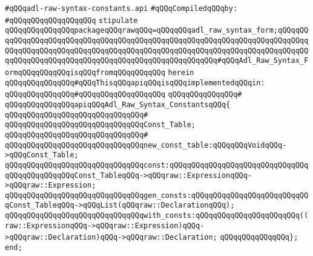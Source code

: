 \label{src/lib/compiler/back/low/tools/adl-syntax/adl-raw-syntax-constants.api}
\verb|#qQQqadl-raw-syntax-constants.api|\newline
\newline
\verb|#qQQqCompiledqQQqby:|\newline
\verb|#qQQqqQQqqQQqqQQqqQQq|\newline
\newline
\verb|stipulate|\newline
\verb|qQQqqQQqqQQqqQQqpackageqQQqrawqQQq=qQQqqQQqadl_raw_syntax_form;qQQqqQQqqQQqqQQqqQQqqQQqqQQqqQQqqQQqqQQqqQQqqQQqqQQqqQQqqQQqqQQqqQQqqQQqqQQqqQQqqQQqqQQqqQQqqQQqqQQqqQQqqQQqqQQqqQQqqQQqqQQqqQQqqQQqqQQqqQQqqQQqqQQqqQQqqQQqqQQqqQQqqQQqqQQqqQQqqQQqqQQqqQQqqQQqqQQq#qQQqAdl_Raw_Syntax_FormqQQqqQQqqQQqisqQQqfromqQQqqQQqqQQq|\newline
\verb|herein|\newline
\newline
\verb|qQQqqQQqqQQqqQQq#qQQqThisqQQqapiqQQqisqQQqimplementedqQQqin:|\newline
\verb|qQQqqQQqqQQqqQQq#qQQqqQQqqQQqqQQqqQQq|\newline
\verb|qQQqqQQqqQQqqQQq#|\newline
\verb|qQQqqQQqqQQqqQQqapiqQQqAdl_Raw_Syntax_ConstantsqQQq{|\newline
\verb|qQQqqQQqqQQqqQQqqQQqqQQqqQQqqQQq#|\newline
\verb|qQQqqQQqqQQqqQQqqQQqqQQqqQQqqQQqConst_Table;|\newline
\verb|qQQqqQQqqQQqqQQqqQQqqQQqqQQqqQQq#|\newline
\verb|qQQqqQQqqQQqqQQqqQQqqQQqqQQqqQQqnew_const_table:qQQqqQQqVoidqQQq->qQQqConst_Table;|\newline
\verb|qQQqqQQqqQQqqQQqqQQqqQQqqQQqqQQqconst:qQQqqQQqqQQqqQQqqQQqqQQqqQQqqQQqqQQqqQQqqQQqqQQqConst_TableqQQq->qQQqraw::ExpressionqQQq->qQQqraw::Expression;|\newline
\verb|qQQqqQQqqQQqqQQqqQQqqQQqqQQqqQQqgen_consts:qQQqqQQqqQQqqQQqqQQqqQQqqQQqConst_TableqQQq->qQQqList(qQQqraw::DeclarationqQQq);|\newline
\verb|qQQqqQQqqQQqqQQqqQQqqQQqqQQqqQQqwith_consts:qQQqqQQqqQQqqQQqqQQqqQQq((raw::ExpressionqQQq->qQQqraw::Expression)qQQq->qQQqraw::Declaration)qQQq->qQQqraw::Declaration;|\newline
\verb|qQQqqQQqqQQqqQQq};|\newline
\verb|end;|\newline

